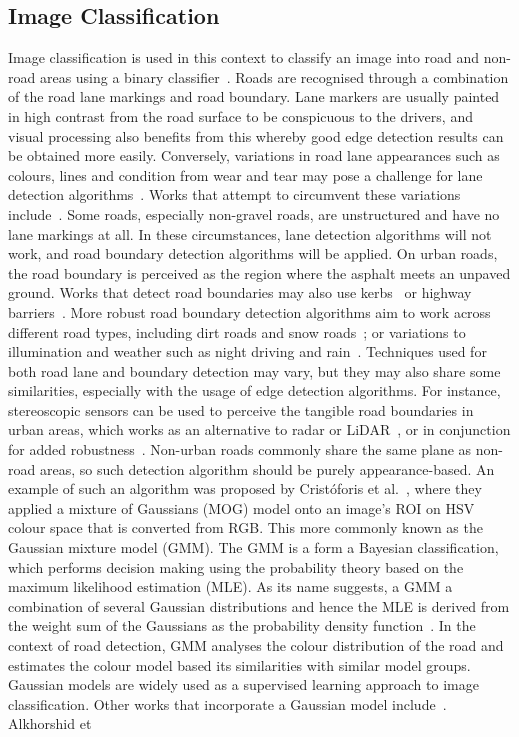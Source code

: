 \subsection{Image Classification} \label{secimage}
Image classification is used in this context to classify an image into road and non-road areas using a binary classifier~\cite{cristoforis_real-time_2016}. Roads are recognised through a combination of the road lane markings and road boundary. Lane markers are usually painted in high contrast from the road surface to be conspicuous to the drivers, and visual processing also benefits from this whereby good edge detection results can be obtained more easily. Conversely, variations in road lane appearances such as colours, lines and condition from wear and tear may pose a challenge for lane detection algorithms~\cite{j._c._mccall_video-based_2006}. Works that attempt to circumvent these variations include~\cite{fernando_real-time_2014,j._huang_robust_2013}. Some roads, especially non-gravel roads, are unstructured and have no lane markings at all. In these circumstances, lane detection algorithms will not work, and road boundary detection algorithms will be applied. On urban roads, the road boundary is perceived as the region where the asphalt meets an unpaved ground. Works that detect road boundaries may also use kerbs~\cite{f._oniga_curb_2011} or highway barriers~\cite{t._scharwachter_visual_2014}. More robust road boundary detection algorithms aim to work across different road types, including dirt roads and snow roads~\cite{h._kong_general_2010}; or variations to illumination and weather such as night driving and rain~\cite{j._dai_night-time_2014,shibata_detection_2014}. Techniques used for both road lane and boundary detection may vary, but they may also share some similarities, especially with the usage of edge detection algorithms. For instance, stereoscopic sensors can be used to perceive the tangible road boundaries in urban areas, which works as an alternative to radar or LiDAR~\cite{hu_roadside_2011}, or in conjunction for added robustness~\cite{c._fernandez_curvature-based_2015}. Non-urban roads commonly share the same plane as non-road areas, so such detection algorithm should be purely appearance-based. An example of such an algorithm was proposed by Crist\'{o}foris et al.~\cite{cristoforis_real-time_2016}, where they applied a mixture of Gaussians (MOG) model onto an image's ROI on HSV colour space that is converted from RGB. This more commonly known as the Gaussian mixture model (GMM). The GMM is a form a Bayesian classification, which performs decision making using the probability theory based on the maximum likelihood estimation (MLE). As its name suggests, a GMM a combination of several Gaussian distributions and hence the MLE is derived from the weight sum of the Gaussians as the probability density function~\cite{paalanen_feature_2006}. In the context of road detection, GMM analyses the colour distribution of the road and estimates the colour model based its similarities with similar model groups. Gaussian models are widely used as a supervised learning approach to image classification.   Other works that incorporate a Gaussian model include~\cite{m._aly_real_2008,wang_adaptive_2015}. Alkhorshid et 